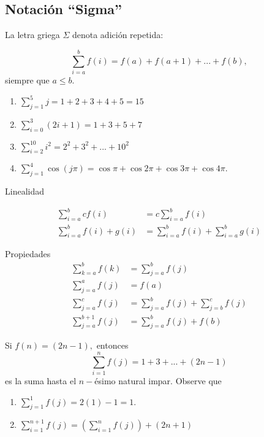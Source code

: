 \subsection{Notaci\'on ``Sigma''}


	La letra griega $\Sigma$ denota adici\'on repetida:
	
	$$
	\sum_{i=a}^{b} f(i)=f(a)+f(a+1)+...+f(b),
	$$ siempre que $a\leq b.$



	\begin{exmp}
		\label{ayr:exmp23.1}
		\begin{enumerate}
			\item $\sum_{j=1}^{5} j = 1+2+3+4+5 =15$
			\item $\sum_{i=0}^{3} \left( 2i+1 \right)=
			1+3+5+7$
			\item $\sum_{i=2}^{10} i^{2}=2^{2}+3^{2}+...+10^{2}$
			\item $\sum_{j=1}^{4}\cos(j\pi)=
			\cos\pi+ \cos 2\pi + \cos 3\pi +\cos 4\pi.$
		\end{enumerate}
		
	\end{exmp}
	



	{Linealidad}
	\begin{prop}
		\label{suma:linealidad}
		\begin{align}
			\sum_{i=a}^{b} cf(i)&=c \sum_{i=a}^{b} f(i)\\
			\sum_{i=a}^{b} f(i)+g(i)&= \sum_{i=a}^{b} f(i)
			+\sum_{i=a}^{b} g(i)
		\end{align}
		
	\end{prop}
	



	{Propiedades}
	\begin{align}
		\sum_{k=a}^{b}f(k)&=\sum_{j=a}^{b}f(j)\\
		\sum_{j=a}^{a}f(j)&=f(a) \\
		\sum_{j=a}^{c}f(j)&=\sum_{j=a}^{b}f(j)+\sum_{j=b}^{c}f(j) \\
		\sum_{j=a}^{b+1}f(j)&=\sum_{j=a}^{b}f(j)+f(b)
	\end{align}
	



	\begin{exmp}
		Si $f(n)=(2n-1),$ entonces
		$$
		\sum_{i=1}^{n}f(j)=1+3+...+\left( 2n-1 \right)
		$$ es la suma hasta el $n-$\'esimo natural impar.  Observe que 
		\begin{enumerate}
			\item $\sum_{j=1}^{1}f(j)=2(1)-1=1.$
			\item $\sum_{i=1}^{n+1}f(j)=\left( \sum_{i=1}^{n}f(j) \right)+\left( 2n+1 \right)$
		\end{enumerate}
		
	\end{exmp}
	



